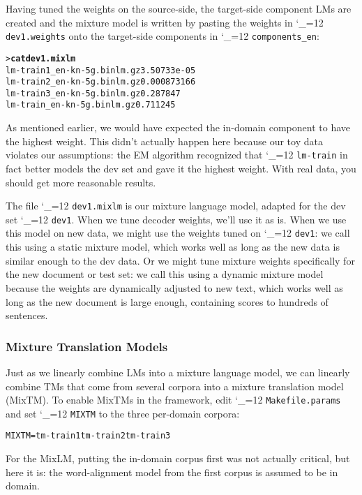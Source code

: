 \documentclass[11pt,letterpaper]{article}
\def\code{\begingroup\catcode`\_=12 \codex}
\newcommand{\codex}[1]{\texttt{#1}\endgroup}
\begin{document}
Having tuned the weights on the source-side, the target-side component LMs are
created and the mixture model is written by pasting the weights in
\code{dev1.weights} onto the target-side components in \code{components_en}:
\begin{small}
\begin{alltt}
   > \textbf{cat dev1.mixlm}
   lm-train1_en-kn-5g.binlm.gz     3.50733e-05
   lm-train2_en-kn-5g.binlm.gz     0.000873166
   lm-train3_en-kn-5g.binlm.gz     0.287847
   lm-train_en-kn-5g.binlm.gz      0.711245
\end{alltt}
\end{small}

As mentioned earlier, we would have expected the in-domain component to have
the highest weight.  This didn't actually happen here because our toy data
violates our assumptions: the EM algorithm recognized that \code{lm-train} in
fact better models the dev set and gave it the highest weight.  With real data,
you should get more reasonable results.

The file \code{dev1.mixlm} is our mixture language model, adapted for the
dev set \code{dev1}.  When we tune decoder weights, we'll use it as is.  When
we use this model on new data, we might use the weights tuned on
\code{dev1}: we call this using a static mixture model, which works well as
long as the new data is similar enough to the dev data.  Or we might tune
mixture weights specifically for the new document or test set: we call this
using a dynamic mixture model because the weights are dynamically adjusted to
new text, which works well as long as the new document is large enough,
containing scores to hundreds of sentences.

\subsubsection{Mixture Translation Models} \label{MIXTM}

Just as we linearly combine LMs into a mixture language model, we can linearly
combine TMs that come from several corpora into a mixture translation model
(MixTM).  To enable MixTMs in the framework, edit \code{Makefile.params} and
set \code{MIXTM} to the three per-domain corpora:
\begin{small}
\begin{alltt}
   MIXTM = tm-train1 tm-train2 tm-train3
\end{alltt}
\end{small}

For the MixLM, putting the in-domain corpus first was not actually critical,
but here it is: the word-alignment model from the first corpus is assumed to be
in domain.
\end{document}
